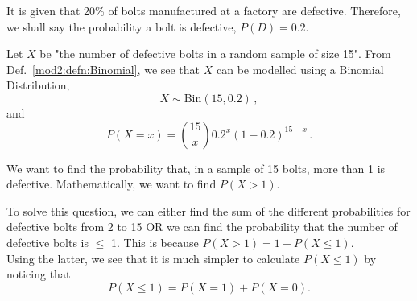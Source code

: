 %
%
%

\begin{subquestions}
	
\subquestion

It is given that 20\% of bolts manufactured at a factory are defective. Therefore, we shall say the probability a bolt is defective, $P(D)= 0.2$. 

\begin{subsubquestions}
	
   \subsubquestion	

   Let $X$ be "the number of defective bolts in a random sample of size 15". From Def.~\ref{mod2:defn:Binomial}, we see that $X$ can be modelled using a Binomial Distribution,
   \begin{equation}
   	 X \sim \text{Bin}(15,0.2) \,,
   \end{equation}
   and
   \begin{equation}
   	P(X = x) = { 15 \choose x} 0.2^x (1-0.2)^{15-x} \,. 
   \end{equation}

   We want to find the probability that, in a sample of 15 bolts, more than 1 is defective. Mathematically, we want to find $P(X>1)$. 

   To solve this question, we can either find the sum of the different probabilities for defective bolts from 2 to 15 OR we can find the probability that the number of defective bolts is $\leq$ 1. This is because $P(X>1)=1-P(X\leq1)$.  \\

   Using the latter, we see that it is much simpler to calculate $P(X\leq1) $   by noticing that 
   \begin{equation}
   	P(X \leq 1)  =  P(X=1)+P(X=0). 
   \end{equation}


\end{subsubquestions}
\end{subquestions}
